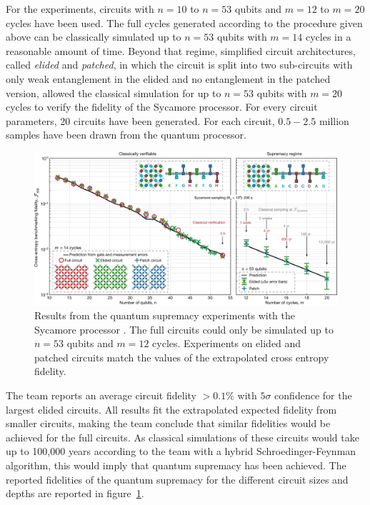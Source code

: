 For the experiments, circuits with $n=10$ to $n=53$ qubits and
$m=12$ to $m=20$ cycles have been used. The full cycles generated according to the procedure
given above can be classically simulated up to $n=53$ qubits with $m=14$ cycles
in a reasonable amount of time. Beyond that regime, simplified circuit
architectures, called \textit{elided} and \textit{patched}, in which the
circuit is split into two sub-circuits with only weak entanglement in the elided and no
entanglement in the patched version, allowed the classical simulation for up to $n=53$ qubits with $m=20$ cycles to
verify the fidelity of the Sycamore processor. For every circuit parameters, 20
circuits have been generated. For each circuit, $0.5-2.5$ million samples have been drawn
from the quantum processor.

\begin{figure}[H]
  \centering
  \label{fig:supremacy_results}
  \includegraphics[width=\textwidth]{figures/supremacy_results}
  \caption[Cross Entropy Fidelity of the Sycamore Processor]{Results from the quantum supremacy experiments 
  with the Sycamore processor \cite{martines2019supremacy}. The full circuits could only be simulated up to $n=53$ qubits and 
  $m=12$ cycles. Experiments on elided and patched circuits match the values of the extrapolated cross entropy fidelity.}
\end{figure}

The team reports an average circuit fidelity $ > 0.1\%$ with $5\sigma$ confidence
for the largest elided circuits. All results fit the extrapolated expected
fidelity from smaller circuits, making the team conclude that similar fidelities
would be achieved for the full circuits. As classical simulations of these
circuits would take up to 100,000 years according to the team with a hybrid
Schroedinger-Feynman algorithm, this would imply
that quantum supremacy has been achieved. The reported fidelities of the quantum supremacy for
the different circuit sizes and depths are reported in figure~\ref{fig:supremacy_results}.

